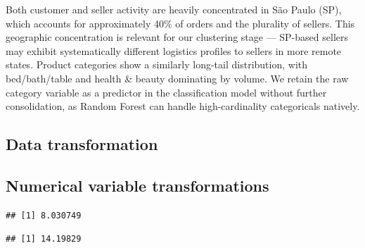 \documentclass[
]{article}
\newenvironment{Shaded}{\begin{snugshade}}{\end{snugshade}}
\newcommand{\AttributeTok}[1]{\textcolor[rgb]{0.13,0.29,0.53}{#1}}
\newcommand{\CommentTok}[1]{\textcolor[rgb]{0.56,0.35,0.01}{\textit{#1}}}
\newcommand{\ConstantTok}[1]{\textcolor[rgb]{0.56,0.35,0.01}{#1}}
\newcommand{\FunctionTok}[1]{\textcolor[rgb]{0.13,0.29,0.53}{\textbf{#1}}}
\newcommand{\NormalTok}[1]{#1}
\newcommand{\SpecialCharTok}[1]{\textcolor[rgb]{0.81,0.36,0.00}{\textbf{#1}}}
\begin{document}
Both customer and seller activity are heavily concentrated in São Paulo
(SP), which accounts for approximately 40\% of orders and the plurality
of sellers. This geographic concentration is relevant for our clustering
stage --- SP-based sellers may exhibit systematically different
logistics profiles to sellers in more remote states. Product categories
show a similarly long-tail distribution, with bed/bath/table and health
\& beauty dominating by volume. We retain the raw category variable as a
predictor in the classification model without further consolidation, as
Random Forest can handle high-cardinality categoricals natively.

\subsection{Data transformation}\label{data-transformation}

\subsection{Numerical variable
transformations}\label{numerical-variable-transformations}

\begin{Shaded}
\end{Shaded}

\begin{verbatim}
## [1] 8.030749
\end{verbatim}

\begin{Shaded}
\end{Shaded}

\begin{verbatim}
## [1] 14.19829
\end{verbatim}

\begin{Shaded}
\end{Shaded}
\end{document}

